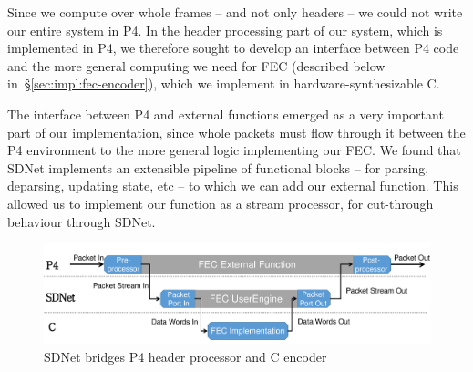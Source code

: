 %
%

         
Since we compute over whole frames -- and not only headers -- we could
not write our entire system in P4. In the header processing part of
our system, which is implemented in P4, we therefore sought to develop
an interface between P4 code and the more general computing we need
for FEC (described below in~\S\ref{sec:impl:fec-encoder}), which we
implement in hardware-synthesizable C.

The interface between P4 and external functions emerged as a very
important part of our implementation, since whole packets must flow
through it between the P4 environment to the more general logic
implementing our FEC. We found that SDNet implements an extensible
pipeline of functional blocks -- for parsing, deparsing, updating
state, etc -- to which we can add our external function. This allowed us to implement our function as a stream processor, for cut-through behaviour through SDNet.

\begin{figure}
  \centering
  \includegraphics[width=0.4\paperwidth]{figures/sdnet-interface.png}
  \caption{\label{fig:sdnet-interface}SDNet bridges P4 header processor and C encoder}
\end{figure}

